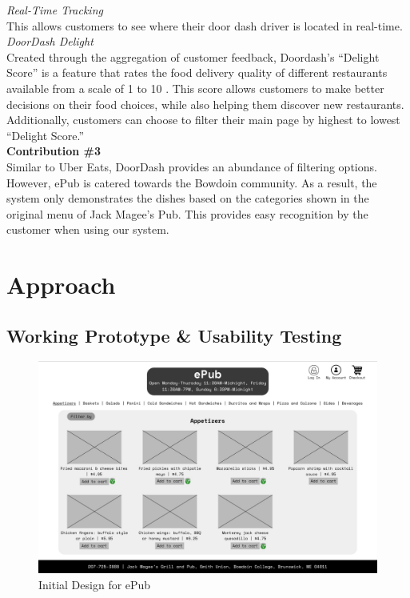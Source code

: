 \documentclass[runningheads]{llncs}
\begin{document}
\noindent\textit{Real-Time Tracking} \\
This allows customers to see where their door dash driver is located in real-time.  \\

\noindent\textit{DoorDash Delight}\\
Created through the aggregation of customer feedback, Doordash’s “Delight Score” is a feature that rates the food delivery quality of different restaurants available from a scale of 1 to 10 \cite{ddelight}. This score allows customers to make better decisions on their food choices, while also helping them discover new restaurants. Additionally, customers can choose to filter their main page by highest to lowest “Delight Score.”\\

\noindent\textbf{Contribution \#3}\\
Similar to Uber Eats, DoorDash provides an abundance of filtering options. However, ePub is catered towards the Bowdoin community. As a result, the system only demonstrates the dishes based on the categories shown in the original menu of Jack Magee's Pub. This provides easy recognition by the customer when using our system. 

\section{Approach}

\subsection{Working Prototype \& Usability Testing}

\begin{figure}[H]
    \centering
    \includegraphics[width=13cm]{images/epub_design-nicole.jpeg}
    \caption{Initial Design for ePub}
\end{figure}
\end{document}
